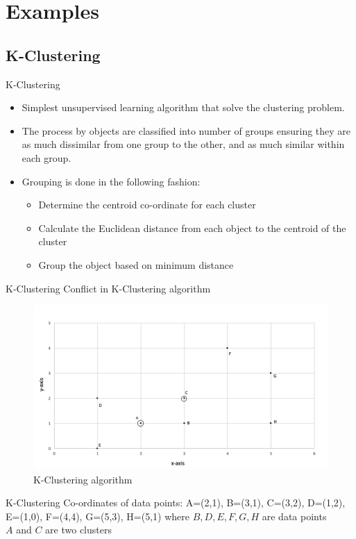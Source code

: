 \section{Examples}
\subsection{K-Clustering}
\begin{frame}{K-Clustering}
  \begin{itemize}
    \item Simplest unsupervised learning algorithm that solve the clustering problem.
    \item The process by objects are classified into number of groups ensuring they are as much dissimilar from one group to the other, and as much similar within each group.
    \item Grouping is done in the following fashion:
          \begin{itemize}
            \item Determine the centroid co-ordinate for each cluster
            \item Calculate the Euclidean distance from each object to the centroid of the cluster
            \item Group the object based on minimum distance
          \end{itemize}
  \end{itemize}
\end{frame}

\begin{frame}{K-Clustering}
	Conflict in K-Clustering algorithm
			\begin{figure}
			\includegraphics[width=0.8\linewidth]{figures/k-cluster.jpg}
			\caption{K-Clustering algorithm}
			\end{figure}
\end{frame}

\begin{frame}{K-Clustering}
  Co-ordinates of data points:
  \newline
  \newline
  A=(2,1), B=(3,1), C=(3,2), D=(1,2),\\
  E=(1,0), F=(4,4), G=(5,3), H=(5,1)
  \newline
  \newline
  where $B, D, E, F, G, H$ are data points\\
  $A$ and $C$ are two clusters\\
\end{frame}

